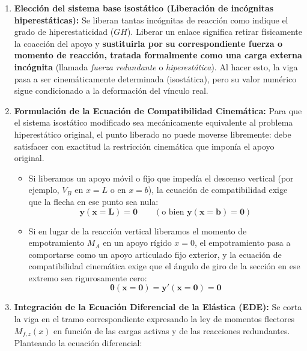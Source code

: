 \begin{enumerate}
    \item \textbf{Elección del sistema base isostático (Liberación de incógnitas hiperestáticas):}
          Se liberan tantas incógnitas de reacción como indique el grado de hiperestaticidad ($GH$). Liberar un enlace significa retirar físicamente la coacción del apoyo y \textbf{sustituirla por su correspondiente fuerza o momento de reacción, tratada formalmente como una carga externa incógnita} (llamada \textit{fuerza redundante} o \textit{hiperestática}). Al hacer esto, la viga pasa a ser cinemáticamente determinada (isostática), pero su valor numérico sigue condicionado a la deformación del vínculo real.
    \item \textbf{Formulación de la Ecuación de Compatibilidad Cinemática:}
          Para que el sistema isostático modificado sea mecánicamente equivalente al problema hiperestático original, el punto liberado no puede moverse libremente: debe satisfacer con exactitud la restricción cinemática que imponía el apoyo original.
          \begin{itemize}
              \item Si liberamos un apoyo móvil o fijo que impedía el descenso vertical (por ejemplo, $V_B$ en $x = L$ o en $x = b$), la ecuación de compatibilidad exige que la flecha en ese punto sea nula:
                    \begin{equation}
                        \mathbf{y(x = L) = 0} \qquad (\text{o bien } \mathbf{y(x = b) = 0})
                    \end{equation}
              \item Si en lugar de la reacción vertical liberamos el momento de empotramiento $M_A$ en un apoyo rígido $x = 0$, el empotramiento pasa a comportarse como un apoyo articulado fijo exterior, y la ecuación de compatibilidad cinemática exige que el ángulo de giro de la sección en ese extremo sea rigurosamente cero:
                    \begin{equation}
                        \mathbf{\theta(x = 0) = y'(x = 0) = 0}
                    \end{equation}
          \end{itemize}
    \item \textbf{Integración de la Ecuación Diferencial de la Elástica (EDE):}
          Se corta la viga en el tramo correspondiente expresando la ley de momentos flectores $M_{f,z}(x)$ en función de las cargas activas y de las reacciones redundantes. Planteando la ecuación diferencial:

\end{enumerate}
